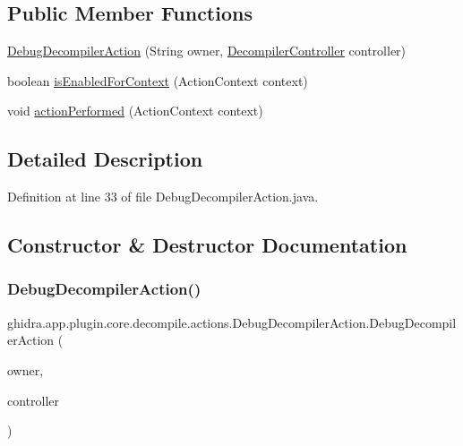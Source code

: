 \subsection*{Public Member Functions}
\begin{DoxyCompactItemize}
\item 
\mbox{\hyperlink{classghidra_1_1app_1_1plugin_1_1core_1_1decompile_1_1actions_1_1_debug_decompiler_action_a11e2e9051c14ea69c6a58abc050ae208}{Debug\+Decompiler\+Action}} (String owner, \mbox{\hyperlink{classghidra_1_1app_1_1decompiler_1_1component_1_1_decompiler_controller}{Decompiler\+Controller}} controller)
\item 
boolean \mbox{\hyperlink{classghidra_1_1app_1_1plugin_1_1core_1_1decompile_1_1actions_1_1_debug_decompiler_action_a8e8216c53c6efcbf986da57796f50314}{is\+Enabled\+For\+Context}} (Action\+Context context)
\item 
void \mbox{\hyperlink{classghidra_1_1app_1_1plugin_1_1core_1_1decompile_1_1actions_1_1_debug_decompiler_action_af2151860ed5ab1069443567f01eab714}{action\+Performed}} (Action\+Context context)
\end{DoxyCompactItemize}


\subsection{Detailed Description}


Definition at line 33 of file Debug\+Decompiler\+Action.\+java.



\subsection{Constructor \& Destructor Documentation}
\mbox{\label{classghidra_1_1app_1_1plugin_1_1core_1_1decompile_1_1actions_1_1_debug_decompiler_action_a11e2e9051c14ea69c6a58abc050ae208}} 
\subsubsection{\texorpdfstring{DebugDecompilerAction()}{DebugDecompilerAction()}}
{\footnotesize\ttfamily ghidra.\+app.\+plugin.\+core.\+decompile.\+actions.\+Debug\+Decompiler\+Action.\+Debug\+Decompiler\+Action (\begin{DoxyParamCaption}\item[{String}]{owner,  }\item[{\mbox{\hyperlink{classghidra_1_1app_1_1decompiler_1_1component_1_1_decompiler_controller}{Decompiler\+Controller}}}]{controller }\end{DoxyParamCaption})\hspace{0.3cm}{\ttfamily [inline]}}



